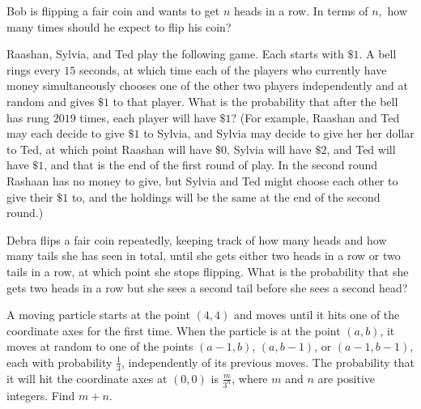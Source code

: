 \documentclass[mast]{lucky}
\begin{document}
\begin{req}[]{3}
Bob is flipping a fair coin and wants to get $n$ heads in a row. In terms of $n,$ how many times should he expect to flip his coin?
\end{req}

\begin{prob}[AMC 12B 2019/19]{3}
 Raashan, Sylvia, and Ted play the following game. Each starts with $\$ 1$. A bell rings every $15$ seconds, at which time each of the players who currently have money simultaneously chooses one of the other two players independently and at random and gives $\$1$ to that player. What is the probability that after the bell has rung $2019$ times, each player will have $\$1$? (For example, Raashan and Ted may each decide to give $\$1$ to Sylvia, and Sylvia may decide to give her her dollar to Ted, at which point Raashan will have $\$0$, Sylvia will have $\$2$, and Ted will have $\$1$, and that is the end of the first round of play. In the second round Rashaan has no money to give, but Sylvia and Ted might choose each other to give their $\$1$ to, and the holdings will be the same at the end of the second round.)
\end{prob}

\begin{prob}[AMC 10B 2019/21]{3}
Debra flips a fair coin repeatedly, keeping track of how many heads and how many tails she has seen in total, until she gets either two heads in a row or two tails in a row, at which point she stops flipping. What is the probability that she gets two heads in a row but she sees a second tail before she sees a second head?
\end{prob}

\begin{prob}[AIME I 2019/5]{3}
A moving particle starts at the point $(4,4)$ and moves until it hits one of the coordinate axes for the first time. When the particle is at the point $(a,b)$, it moves at random to one of the points $(a-1,b)$, $(a,b-1)$, or $(a-1,b-1)$, each with probability $\tfrac{1}{3}$, independently of its previous moves. The probability that it will hit the coordinate axes at $(0,0)$ is $\tfrac{m}{3^n}$, where $m$ and $n$ are positive integers. Find $m + n$.
\end{prob}

\end{document}
